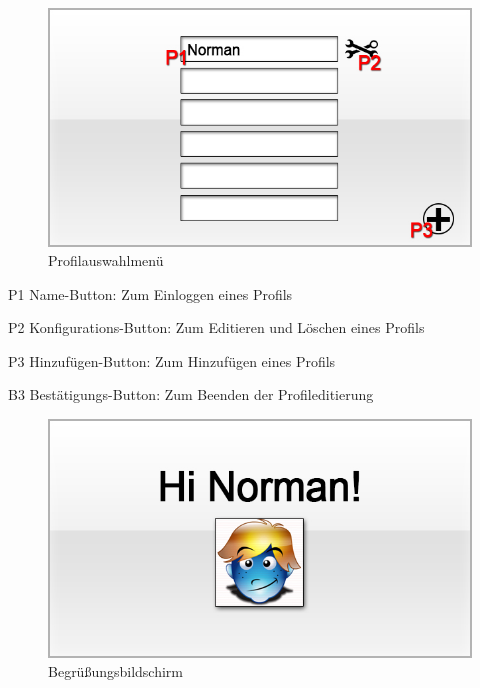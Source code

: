 
\begin{figure}[H]
\centering
\includegraphics[scale=0.55]{../gui/_jpeg_numeration/choose_profile.jpg}
\caption{Profilauswahlmenü}
\label{fig:Profilauswahlmenu}
\end{figure}
\begin{description*}
\item[P1] Name-Button: Zum Einloggen eines Profils
\item[P2] Konfigurations-Button: Zum Editieren und Löschen eines Profils
\item[P3] Hinzufügen-Button: Zum Hinzufügen eines Profils
\item[B3] Bestätigungs-Button: Zum Beenden der Profileditierung
\end{description*}


\begin{figure}[H]
\centering
\includegraphics[scale=0.55]{../gui/_jpeg_numeration/welcome.jpg}
\caption{Begrüßungsbildschirm}
\label{fig:Begrussungsbildschirm}
\end{figure}

